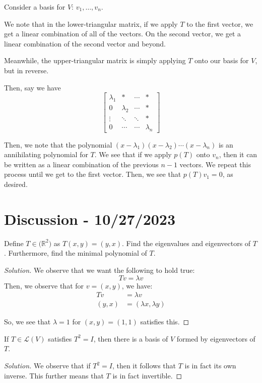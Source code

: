\documentclass[openany]{book}
\newenvironment{solution}{\begin{proof}[Solution]}{\end{proof}}
\newcommand{\RR}{\mathbb{R}}
\begin{document}
Consider a basis for $V$: $v_{1}, \ldots, v_{n}$.

We note that in the lower-triangular matrix, if we apply $T$ to the first vector, we get a linear combination of all of the vectors. On the second vector, we get a linear combination of the second vector and beyond.

Meanwhile, the upper-triangular matrix is simply applying $T$ onto our basis for $V$, but in reverse.

Then, say we have
\begin{equation*}
	\begin{bmatrix}
		\lambda_{1} & * & \cdots & * \\
		0 & \lambda_2 & \cdots & * \\
		\vdots & \ddots & \ddots & * \\
		0 & \cdots & \cdots & \lambda_n
	\end{bmatrix}
\end{equation*}

Then, we note that the polynomial $(x-\lambda_1)(x-\lambda_2)\cdots(x-\lambda_n)$ is an annihilating polynomial for $T$. We see that if we apply $p(T)$ onto $v_{n}$, then it can be written as a linear combination of the previous $n-1$ vectors. We repeat this process until we get to the first vector. Then, we see that $p(T)v_{1} = 0$, as desired.

\section{Discussion - 10/27/2023}
\begin{hw}
	Define $T \in \mathcal (\RR^{2})$ as $T(x,y) = (y,x)$. Find the eigenvalues and eigenvectors of $T$. Furthermore, find the minimal polynomial of $T$.
\end{hw}
\begin{solution}
	We observe that we want the following to hold true:
	\begin{equation*}
		Tv = \lambda v
	\end{equation*}
	Then, we observe that for $v = (x,y)$, we have:
	\begin{align*}
		Tv &= \lambda v \\
		(y,x) &= (\lambda x, \lambda y)
	\end{align*}

	So, we see that $\lambda = 1$ for $(x,y) = (1,1)$ satisfies this.
\end{solution}

\begin{hw}
	If $T \in \mathcal L(V)$ satisfies $T^{2} = I$, then there is a basis of $V$ formed by eigenvectors of $T$.
\end{hw}
\begin{solution}
	We observe that if $T^{2} = I$, then it follows that $T$ is in fact its own inverse. This further means that $T$ is in fact invertible.
\end{solution}
\end{document}
